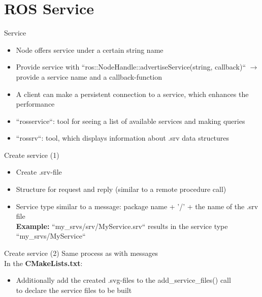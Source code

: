 \documentclass{beamer}
\begin{document}
\section{ROS Service}
\begin{frame}{Service}
	\begin{itemize}
		\item Node offers service under a certain string name
		\item Provide service with ``ros::NodeHandle::advertiseService(string, callback)`` $\rightarrow$ provide a service name and a callback-function
		\item A client can make a persistent connection to a service, which enhances the performance
		\item ``rosservice``: tool for seeing a list of available services and making queries
		\item ``rossrv``: tool, which displays information about .srv data structures
	\end{itemize}
\end{frame}	
\begin{frame}{Create service (1)}
	\begin{itemize}
		\item Create .srv-file
		\item Structure for request and reply (similar to a remote procedure call)
		
		\item Service type similar to a message: package name + '/' + the name of the .srv file\\
		\textbf{Example:} ``my\_srvs/srv/MyService.srv`` results in the service type ``my\_srvs/MyService``
	\end{itemize}
\end{frame}
\begin{frame}{Create service (2)}
	Same process as with messages\\
	In the \textbf{CMakeLists.txt}:\\
	\begin{itemize}
		\item Additionally add the created .svg-files to the add\_service\_files() call\\
		to declare the service files to be built
	\end{itemize}
\end{frame}
\end{document}
